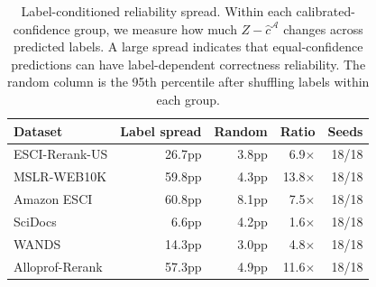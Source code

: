 \begin{table}[t]
\centering
\small
\caption{Label-conditioned reliability spread. Within each calibrated-confidence group, we measure how much \(Z-\hat c^{\mathcal{A}}\) changes across predicted labels. A large spread indicates that equal-confidence predictions can have label-dependent correctness reliability. The random column is the 95th percentile after shuffling labels within each group.}
\label{tab:label_conditional_residual}
\setlength{\tabcolsep}{3.8pt}
\begin{tabular}{lrrrr}
\toprule
Dataset & Label spread & Random & Ratio & Seeds \\
\midrule
ESCI-Rerank-US & 26.7pp & 3.8pp & 6.9$\times$ & 18/18 \\
MSLR-WEB10K & 59.8pp & 4.3pp & 13.8$\times$ & 18/18 \\
Amazon ESCI & 60.8pp & 8.1pp & 7.5$\times$ & 18/18 \\
SciDocs & 6.6pp & 4.2pp & 1.6$\times$ & 18/18 \\
WANDS & 14.3pp & 3.0pp & 4.8$\times$ & 18/18 \\
Alloprof-Rerank & 57.3pp & 4.9pp & 11.6$\times$ & 18/18 \\
\bottomrule
\end{tabular}
\end{table}
